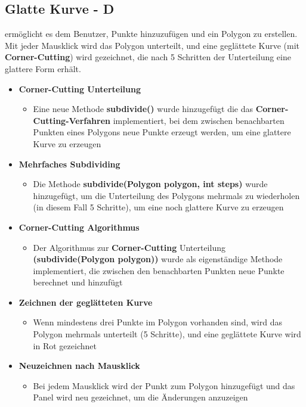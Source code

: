 \subsection*{Glatte Kurve - D}
ermöglicht es dem Benutzer, Punkte hinzuzufügen und ein Polygon zu erstellen. Mit jeder Mausklick wird das Polygon unterteilt, und eine geglättete Kurve (mit \textbf{Corner-Cutting}) wird gezeichnet, die nach 5 Schritten der Unterteilung eine glattere Form erhält.
\begin{itemize}[itemsep=0pt]
   \item \textbf{Corner-Cutting Unterteilung}
   \begin{itemize}
    \item Eine neue Methode \textbf{subdivide()} wurde hinzugefügt die  das \textbf{Corner-Cutting-Verfahren} implementiert, bei dem zwischen benachbarten Punkten eines Polygons neue Punkte erzeugt werden, um eine glattere Kurve zu erzeugen
   \end{itemize}
   \item \textbf{Mehrfaches Subdividing} 
   \begin{itemize}
    \item Die Methode \textbf{subdivide(Polygon polygon, int steps)} wurde hinzugefügt, um die Unterteilung des Polygons mehrmals zu wiederholen (in diesem Fall 5 Schritte), um eine noch glattere Kurve zu erzeugen
   \end{itemize}
   \item \textbf{Corner-Cutting Algorithmus}
   \begin{itemize}
    \item Der Algorithmus zur \textbf{Corner-Cutting} Unterteilung \textbf{(subdivide(Polygon polygon))} wurde als eigenständige Methode implementiert, die zwischen den benachbarten Punkten neue Punkte berechnet und hinzufügt
   \end{itemize}
   \item \textbf{Zeichnen der geglätteten Kurve}
   \begin{itemize}
    \item Wenn mindestens drei Punkte im Polygon vorhanden sind, wird das Polygon mehrmals unterteilt (5 Schritte), und eine geglättete Kurve wird in Rot gezeichnet
   \end{itemize}
   \item \textbf{Neuzeichnen nach Mausklick}
   \begin{itemize}
    \item Bei jedem Mausklick wird der Punkt zum Polygon hinzugefügt und das Panel wird neu gezeichnet, um die Änderungen anzuzeigen
   \end{itemize}
\end{itemize}
\begin{codeblock}
    
\end{codeblock}

